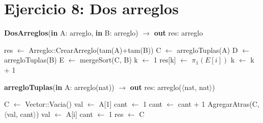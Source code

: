 \section{Ejercicio 8: Dos arreglos}
\begin{algorithm}[H]
\caption{
    \textbf{DosArreglos}(\textbf{in} A: arreglo, \textbf{in} B: arreglo) $\to$ \textbf{out} res: arreglo 
}
    \begin{algorithmic}[1]
        \State res $\gets$ Arreglo::CrearArreglo(tam(A)+tam(B))
        \State C $\gets$ arregloTuplas(A) 
        \State D $\gets$ arregloTuplas(B) 
        \State E $\gets$ mergeSort(C, B) 
        \State k $\gets$ 1
         
                \State res[k] $\gets$ $\pi_{1}(E[i])$
                \State k $\gets$ k + 1
            \EndFor
        \EndFor
    \end{algorithmic}
\end{algorithm}

\begin{algorithm}[H]
\caption{
    \textbf{arregloTuplas}(\textbf{in} A: arreglo(nat)) $\to$ \textbf{out} res: arreglo($\langle$nat, nat$\rangle$) 
}
    \begin{algorithmic}[1]
        \State C $\gets$ Vector::Vacia()
        \State val $\gets$ A[1]
        \State cant $\gets$ 1
         
             
                \State cant $\gets$ cant + 1 
            \Else
                \State AgregarAtras(C, $\langle$val, cant$\rangle$) 
                \State val $\gets$ A[i] 
                \State cant $\gets$ 1 
            \EndIf
        \EndFor
        \State res $\gets$ C
    \end{algorithmic}
\end{algorithm}